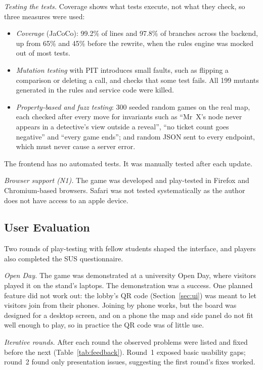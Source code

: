 \documentclass[lettersize,journal]{IEEEtran}
\begin{document}
\emph{Testing the tests.} Coverage shows what tests execute, not what they check, so three measures were used:
\begin{itemize}
	\item \emph{Coverage} (JaCoCo): 99.2\% of lines and 97.8\% of branches across the backend, up from 65\% and 45\% before the rewrite, when the rules engine was mocked out of most tests.
	\item \emph{Mutation testing} with PIT introduces small faults, such as flipping a comparison or deleting a call, and checks that some test fails. All 199 mutants generated in the rules and service code were killed.
	\item \emph{Property-based and fuzz testing}: 300 seeded random games on the real map, each checked after every move for invariants such as ``Mr~X's node never appears in a detective's view outside a reveal'', ``no ticket count goes negative'' and ``every game ends''; and random JSON sent to every endpoint, which must never cause a server error.
\end{itemize}
The frontend has no automated tests. It was manually tested after each update.

\emph{Browser support (N1).} The game was developed and play-tested in Firefox and Chromium-based browsers. Safari was not tested systematically as the author does not have access to an apple device.

\subsection{User Evaluation}\label{sec:users}
Two rounds of play-testing with fellow students shaped the interface, and players also completed the SUS questionnaire.

\emph{Open Day.} The game was demonstrated at a university Open Day, where visitors played it on the stand's laptops. The demonstration was a success. One planned feature did not work out: the lobby's QR code (Section~\ref{sec:ui}) was meant to let visitors join from their phones. Joining by phone works, but the board was designed for a desktop screen, and on a phone the map and side panel do not fit well enough to play, so in practice the QR code was of little use.

\emph{Iterative rounds.} After each round the observed problems were listed and fixed before the next (Table~\ref{tab:feedback}). Round~1 exposed basic usability gaps; round~2 found only presentation issues, suggesting the first round's fixes worked.
\end{document}
